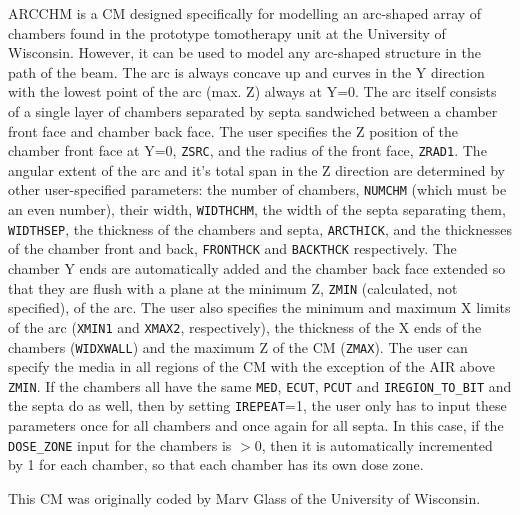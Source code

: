 \documentclass[12pt,twoside]{article}
\begin{document}
ARCCHM is a CM designed specifically for modelling an arc-shaped array of
chambers found in the prototype tomotherapy unit at the University of
Wisconsin.  However, it can be used
to model any arc-shaped structure in the path of the beam.  The arc is
always concave up and curves in the Y direction with the lowest point of the
arc (max. Z) always at Y=0.  The arc itself consists of a single layer of
chambers separated
by septa sandwiched between a chamber front face and chamber back face.  The
user specifies the Z position of the chamber front face at Y=0, {\tt ZSRC},
and the radius of the front face, {\tt ZRAD1}.
The angular extent of the arc
and it's total span in the Z direction are determined by other user-specified
parameters: the number of
chambers, {\tt NUMCHM} (which must be an even number), their width,
{\tt WIDTHCHM}, the width of the septa separating them, {\tt WIDTHSEP}, the
thickness of the chambers and septa, {\tt ARCTHICK}, and the thicknesses of
the chamber front and back, {\tt FRONTHCK} and {\tt BACKTHCK} respectively.
The chamber Y ends are automatically added and the chamber back face extended
so that they are flush with a plane at the minimum Z, {\tt ZMIN} (calculated,
not specified), of the
arc.  The user also specifies the minimum and maximum X limits of the
arc ({\tt XMIN1} and {\tt XMAX2}, respectively), the thickness of the
X ends of the chambers ({\tt WIDXWALL}) and the maximum Z of the CM
({\tt ZMAX}).
The user can specify the media in all regions of the CM with
the exception of the AIR above {\tt ZMIN}.  If the chambers all have
the same {\tt MED}, {\tt ECUT},
{\tt PCUT} and {\tt IREGION\_TO\_BIT} and the septa do as well, then
by setting {\tt IREPEAT}=1, the user only has to input these parameters once
for all chambers and once again for all septa.  In this case, if the {\tt DOSE\_ZONE}
input for the chambers is $>$0, then it is automatically incremented by
1 for each chamber, so that each chamber has its own dose zone.

This CM was originally coded by Marv Glass of the University of
Wisconsin.
\end{document}
